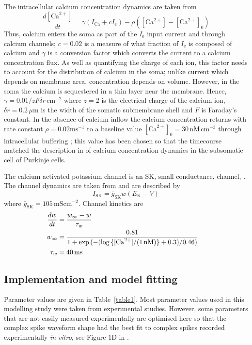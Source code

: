 \documentclass[utf8]{frontiersSCNS} %
\newcommand{\msi}{\,\mathrm{mS cm^{-2}}}
\newcommand{\mse}{\,\mathrm{ms}}
\newcommand{\cm}{\,\mathrm{cm}}
\renewcommand{\k}{\mathrm{K}}
\newcommand{\ca}{\mathrm{Ca}}
\newcommand{\sk}{\mathrm{SK}}
\begin{document}
The intracellular calcium concentration dynamics are taken from
\cite{SterrattEtAl2012,KochSegev1998}
\begin{equation}
\label{eq:ca_concentration}
\frac{d[\ca^{2+}]}{dt}=\gamma (I_\ca+cI_{\mathrm{e}})  -
\rho ([\ca^{2+}]-[\ca^{2+}]_0)
\end{equation}
Thus, calcium enters the soma as part of the $I_\mathrm{e}$ input
current and through calcium channels; $c=0.02$ is a measure of what
fraction of $I_{\mathrm{e}}$ is composed of calcium and $\gamma$ is a
conversion factor which converts the current to a calcium
concentration flux. As well as quantifying the charge of each ion,
this factor needs to account for the distribution of calcium in the
soma; unlike current which depends on membrane area, concentration
depends on volume. However, in the soma the calcium is sequestered in
a thin layer near the membrane. Hence, $\gamma=0.01/zF\delta
r\,\mathrm{cm}^{-2}$ where $z=2$ is the electrical charge of the
calcium ion, $\delta r=0.2\,\mu\mathrm{m}$ is the width of the somatic
submembrane shell and $F$ is Faraday's constant. In the absence of
calcium inflow the calcium concentration returns with rate constant
$\rho=0.02\mathrm{ms}^{-1}$ to a baseline value $[\ca^{2+}]_0
=30\,\mathrm{nM}\cm^{-3}$ through intracellular buffering
\cite{FierroEtAl1998,AiraksinenEtAl1997}; this value has been chosen
so that the timecourse matched the description in
\cite{EilersEtAl1995} of calcium concentration dynamics in the
subsomatic cell of Purkinje cells.

The calcium activated potassium channel is an SK, small conductance,
channel, \cite{LancasterEtAl1991}. The channel dynamics are taken from
\cite{GilliesWillshaw2006} and are described by
\begin{equation}
\label{eq:I_SK}
I_{\sk} = {\bar{g}_{\sk}}w(E_\k-V)
\end{equation}
where $\bar{g}_\sk = 105\msi$. Channel kinetics are
\begin{align}
\label{eq:w_kinetics}
\frac{dw}{dt} &= \frac{w_\infty- w}{\tau_w}\cr
w_{\infty}   &= \frac{0.81}{1 + \exp{(-(\log{\{[\ca^{2+}]/(1\,\mathrm{nM})\}}+0.3)/0.46)}}\cr
\tau_w &= 40 \mse
\end{align}

\subsection{Implementation and model fitting}

Parameter values are given in Table~\ref{table1}. Most parameter
values used in this modelling study were taken from experimental
studies. However, some parameters that are not easily measured
experimentally are optimised here so that the complex spike waveform
shape had the best fit to complex spikes recorded experimentally
\textit{in vitro}, see Figure 1D in \cite{DavieEtAl2008}.
\end{document}
